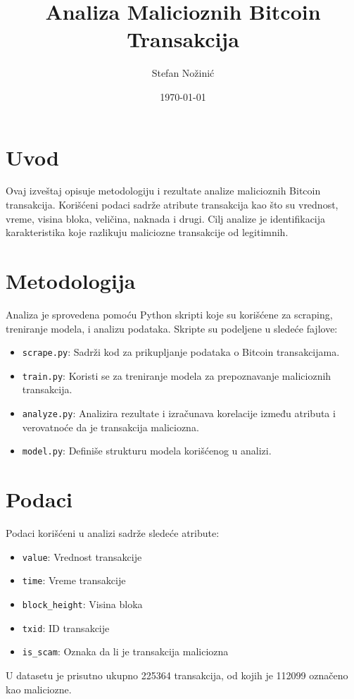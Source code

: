 \documentclass{article}
\title{Analiza Malicioznih Bitcoin Transakcija}
\author{Stefan Nožinić}
\date{\today}
\begin{document}
\maketitle

\section{Uvod}
Ovaj izveštaj opisuje metodologiju i rezultate analize malicioznih Bitcoin transakcija. Korišćeni podaci sadrže atribute transakcija kao što su vrednost, vreme, visina bloka, veličina, naknada i drugi. Cilj analize je identifikacija karakteristika koje razlikuju maliciozne transakcije od legitimnih.

\section{Metodologija}
Analiza je sprovedena pomoću Python skripti koje su korišćene za scraping, treniranje modela, i analizu podataka. Skripte su podeljene u sledeće fajlove:
\begin{itemize}
    \item \texttt{scrape.py}: Sadrži kod za prikupljanje podataka o Bitcoin transakcijama.
    \item \texttt{train.py}: Koristi se za treniranje modela za prepoznavanje malicioznih transakcija.
    \item \texttt{analyze.py}: Analizira rezultate i izračunava korelacije između atributa i verovatnoće da je transakcija maliciozna.
    \item \texttt{model.py}: Definiše strukturu modela korišćenog u analizi.
\end{itemize}

\section{Podaci}
Podaci korišćeni u analizi sadrže sledeće atribute:
\begin{itemize}
    \item \texttt{value}: Vrednost transakcije
    \item \texttt{time}: Vreme transakcije
    \item \texttt{block\_height}: Visina bloka
    \item \texttt{txid}: ID transakcije
    \item \texttt{is\_scam}: Oznaka da li je transakcija maliciozna
\end{itemize}
U datasetu je prisutno ukupno 225364 transakcija, od kojih je 112099 označeno kao maliciozne.
\end{document}
